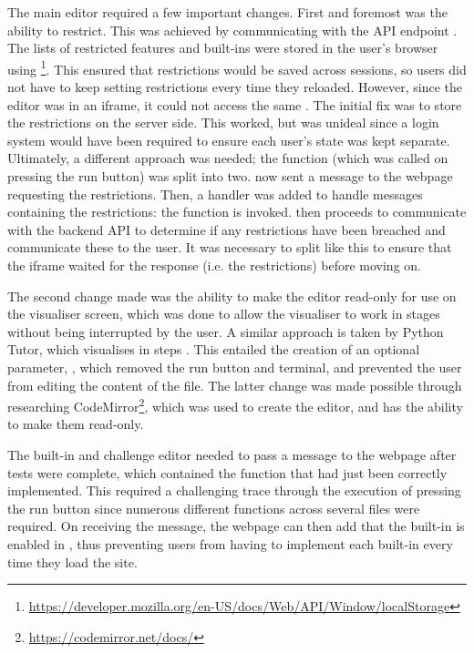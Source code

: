 The main editor required a few important changes. First and foremost was the ability to restrict. This was achieved by communicating with the API endpoint . The lists of restricted features and built-ins were stored in the user's browser using \footnote{\href{https://developer.mozilla.org/en-US/docs/Web/API/Window/localStorage}{https://developer.mozilla.org/en-US/docs/Web/API/Window/localStorage}}. This ensured that restrictions would be saved across sessions, so users did not have to keep setting restrictions every time they reloaded. However, since the editor was in an iframe, it could not access the same . The initial fix was to store the restrictions on the server side. This worked, but was unideal since a login system would have been required to ensure each user's state was kept separate. Ultimately, a different approach was needed; the function  (which was called on pressing the run button) was split into two.  now sent a message to the webpage requesting the restrictions. Then, a handler was added to handle messages containing the restrictions: the function  is invoked.  then proceeds to communicate with the backend API to determine if any restrictions have been breached and communicate these to the user. It was necessary to split like this to ensure that the iframe waited for the response (i.e. the restrictions) before moving on.

The second change made was the ability to make the editor read-only for use on the visualiser screen, which was done to allow the visualiser to work in stages without being interrupted by the user. A similar approach is taken by Python Tutor, which visualises in steps \cite{guo_online_2013}. This entailed the creation of an optional parameter, , which removed the run button and terminal, and prevented the user from editing the content of the file. The latter change was made possible through researching CodeMirror\footnote{\href{https://codemirror.net/docs/}{https://codemirror.net/docs/}}, which was used to create the editor, and has the ability to make them read-only.

The built-in and challenge editor needed to pass a message to the webpage after tests were complete, which contained the function that had just been correctly implemented. This required a challenging trace through the execution of pressing the run button since numerous different functions across several files were required. On receiving the message, the webpage can then add that the built-in is enabled in , thus preventing users from having to implement each built-in every time they load the site.

